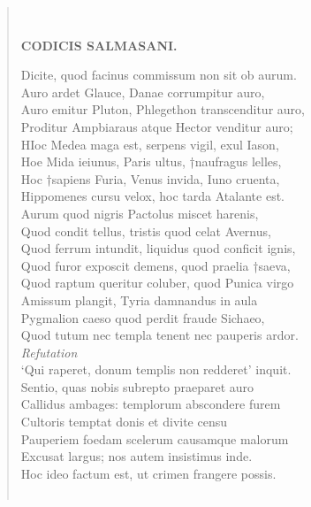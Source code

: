 \documentclass[11pt, a4paper]{report}
\begin{document}
\begin{verse}
        ﻿\pagebreak 
     \marginpar{[93]} \begin{center} \textbf{CODICIS SALMASANI.} \end{center}Dicite, quod facinus commissum non sit ob aurum. \\ Auro ardet Glauce, Danae corrumpitur auro, \\ Auro emitur Pluton, Phlegethon transcenditur auro, \\ Proditur Ampbiaraus atque Hector venditur auro; \\ HIoc Medea maga est, serpens vigil, exul Iason, \\ Hoe Mida ieiunus, Paris ultus, †naufragus lelles, \\ Hoc †sapiens Furia, Venus invida, Iuno cruenta, \\ Hippomenes cursu velox, hoc tarda Atalante est. \\ Aurum quod nigris Pactolus miscet harenis, \\ Quod condit tellus, tristis quod celat Avernus, \\ Quod ferrum intundit, liquidus quod conficit ignis, \\ Quod furor exposcit demens, quod praelia †saeva, \\ Quod raptum queritur coluber, quod Punica virgo \\ Amissum plangit, Tyria damnandus in aula \\ Pygmalion caeso quod perdit fraude Sichaeo, \\ Quod tutum nec templa tenent nec pauperis ardor. \\ \textit{ \lbrack Refutation \rbrack } \\ ‘Qui raperet, donum templis non redderet’ inquit. \\ Sentio, quas nobis subrepto praeparet auro \\ Callidus ambages: templorum abscondere furem \\ Cultoris temptat donis et divite censu \\ Pauperiem foedam scelerum causamque malorum \\ Excusat largus; nos autem insistimus inde. \\ Hoc ideo factum est, ut crimen frangere possis. \\ 
        ﻿\pagebreak 

\end{verse}
\end{document}
